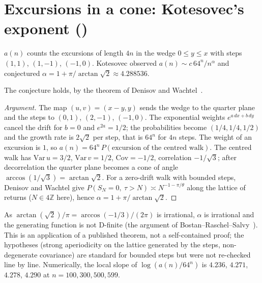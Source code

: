 \section{Excursions in a cone: Kotesovec's exponent ()}\label{s:A361190}
$a(n)$ counts the excursions of length $4n$ in the wedge $0\le y\le x$ with steps $(1,1)$, $(1,-1)$, $(-1,0)$.
Kotesovec observed $a(n)\sim c\,64^n/n^\alpha$ and conjectured $\alpha=1+\pi/\arctan\sqrt2\approx4.288536$.
\begin{proposition} The conjecture holds, by the theorem of Denisov and Wachtel~\cite{DW}.\end{proposition}
\begin{proof}[Argument] The map $(u,v)=(x-y,y)$ sends the wedge to the quarter plane and the steps to
$(0,1)$, $(2,-1)$, $(-1,0)$. The exponential weights $e^{a\,dx+b\,dy}$ cancel the drift for $b=0$ and
$e^{2a}=1/2$; the probabilities become $(1/4,1/4,1/2)$ and the growth rate is $2\sqrt2$ per step, that is
$64^n$ for $4n$ steps. The weight of an excursion is $1$, so $a(n)=64^n\,P(\text{excursion of the centred
walk})$. The centred walk has $\mathrm{Var}\,u=3/2$, $\mathrm{Var}\,v=1/2$, $\mathrm{Cov}=-1/2$, correlation
$-1/\sqrt3$; after decorrelation the quarter plane becomes a cone of angle
$\arccos(1/\sqrt3)=\arctan\sqrt2$. For a zero-drift walk with bounded steps, Denisov and Wachtel give
$P(S_N=0,\ \tau>N)\asymp N^{-1-\pi/\theta}$ along the lattice of returns ($N\in4\mathbb{Z}$ here), hence
$\alpha=1+\pi/\arctan\sqrt2$. \end{proof}
As $\arctan(\sqrt2)/\pi=\arccos(-1/3)/(2\pi)$ is irrational, $\alpha$ is irrational and the generating function
is not D-finite (the argument of Bostan--Raschel--Salvy~\cite{BRS}). This is an application of a published
theorem, not a self-contained proof; the hypotheses (strong aperiodicity on the lattice generated by the
steps, non-degenerate covariance) are standard for bounded steps but were not re-checked line by line.
Numerically, the local slope of $\log(a(n)/64^n)$ is $4.236$, $4.271$, $4.278$, $4.290$ at $n=100,300,500,599$.

